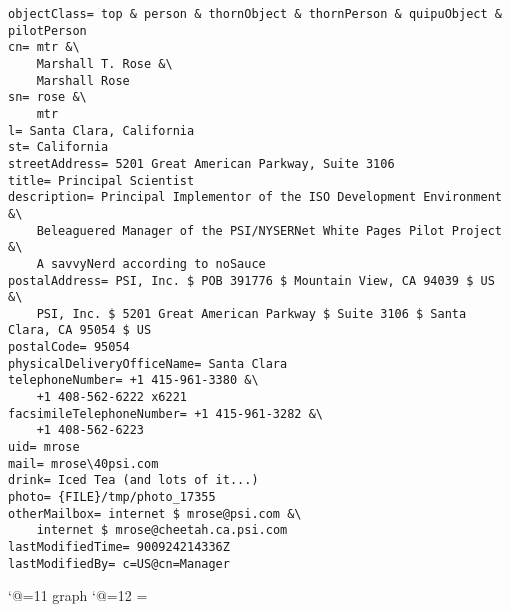 
\scriptsize
\begin{verbatim}
objectClass= top & person & thornObject & thornPerson & quipuObject & pilotPerson
cn= mtr &\
	Marshall T. Rose &\
	Marshall Rose
sn= rose &\
	mtr
l= Santa Clara, California
st= California
streetAddress= 5201 Great American Parkway, Suite 3106
title= Principal Scientist
description= Principal Implementor of the ISO Development Environment &\
	Beleaguered Manager of the PSI/NYSERNet White Pages Pilot Project &\
	A savvyNerd according to noSauce
postalAddress= PSI, Inc. $ POB 391776 $ Mountain View, CA 94039 $ US &\
	PSI, Inc. $ 5201 Great American Parkway $ Suite 3106 $ Santa Clara, CA 95054 $ US
postalCode= 95054
physicalDeliveryOfficeName= Santa Clara
telephoneNumber= +1 415-961-3380 &\
	+1 408-562-6222 x6221
facsimileTelephoneNumber= +1 415-961-3282 &\
	+1 408-562-6223
uid= mrose
mail= mrose\40psi.com
drink= Iced Tea (and lots of it...)
photo= {FILE}/tmp/photo_17355
otherMailbox= internet $ mrose@psi.com &\
	internet $ mrose@cheetah.ca.psi.com
lastModifiedTime= 900924214336Z
lastModifiedBy= c=US@cn=Manager

\end{verbatim}

\catcode`@=11
\expandafter\ifx\csname graph\endcsname\relax {}\box\chardef\insc@unt\graph\fi
\catcode`@=12
\setbox\graph=\empty

